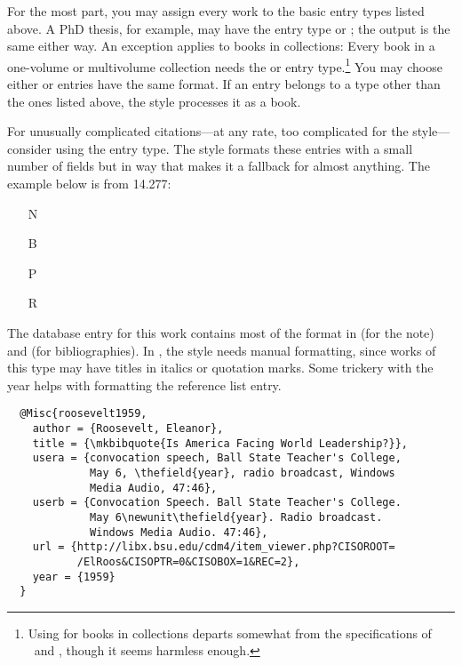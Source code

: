 \documentclass[11pt,letterpaper,oneside]{article}
\begin{document}
\noindent For the most part, you may assign every work to the basic
entry types listed above. A PhD thesis, for example, may have the
entry type  or ; the output is the
same either way. An exception applies to books in collections: Every
book in a one-volume or multivolume collection needs the
 or  entry type.\footnote{Using
 for books in collections departs somewhat from the
specifications of \BibTeX\ and \biblatex, though it seems harmless
enough.} You may choose either  or
 entries have the same format. If an entry belongs
to a type other than the ones listed above, the style processes it as
a book.

For unusually complicated ci\-ta\-tions---at any rate, too complicated
for the style---consider using the  entry type. The
style formats these entries with a small number of fields but in way
that makes it a fallback for almost anything. The example below is
from 14.277:

\begin{itemize}
\item[N] 

\item[B] 

\item[P] 

\item[R] 
\end{itemize}

\noindent The database entry for this work contains most of the format
in  (for the note) and  (for
bibliographies). In , the style needs manual
formatting, since works of this type may have titles in italics or
quotation marks. Some trickery with the year helps with formatting the
reference list entry.

\begin{lstlisting}
  @Misc{roosevelt1959,
    author = {Roosevelt, Eleanor},
    title = {\mkbibquote{Is America Facing World Leadership?}},
    usera = {convocation speech, Ball State Teacher's College,
             May 6, \thefield{year}, radio broadcast, Windows
             Media Audio, 47:46},
    userb = {Convocation Speech. Ball State Teacher's College.
             May 6\newunit\thefield{year}. Radio broadcast.
             Windows Media Audio. 47:46},
    url = {http://libx.bsu.edu/cdm4/item_viewer.php?CISOROOT=
           /ElRoos&CISOPTR=0&CISOBOX=1&REC=2},
    year = {1959}
  }
\end{lstlisting}
\end{document}
